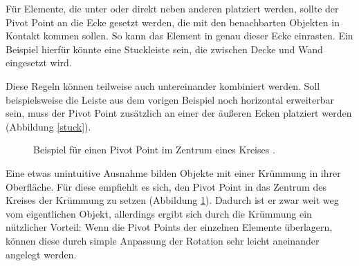 Für Elemente, die unter oder direkt neben anderen platziert werden, sollte der Pivot Point an die Ecke gesetzt werden, die mit den benachbarten Objekten in Kontakt kommen sollen. So kann das Element in genau dieser Ecke einrasten. Ein Beispiel hierfür könnte eine Stuckleiste sein, die zwischen Decke und Wand eingesetzt wird. \parencite{Meler}
\par
Diese Regeln können teilweise auch untereinander kombiniert werden. Soll beispielsweise die Leiste aus dem vorigen Beispiel noch horizontal erweiterbar sein, muss der Pivot Point zusätzlich an einer der äußeren Ecken platziert werden (Abbildung \ref{stuck}). \parencite{Meler}
\newpage
\begin{figure}[H]
\centering
  \caption{Beispiel für einen Pivot Point im Zentrum eines Kreises \parencite{Mader}.}
	\label{pivotRotation}
\end{figure}
\vspace{-10.5pt}
Eine etwas unintuitive Ausnahme bilden Objekte mit einer Krümmung in ihrer Oberfläche. Für diese empfiehlt es sich, den Pivot Point in das Zentrum des Kreises der Krümmung zu setzen (Abbildung \ref{pivotRotation}). Dadurch ist er zwar weit weg vom eigentlichen Objekt, allerdings ergibt sich durch die Krümmung ein nützlicher Vorteil: Wenn die Pivot Points der einzelnen Elemente überlagern, können diese durch simple Anpassung der Rotation sehr leicht aneinander angelegt werden. \parencite{Mader}
